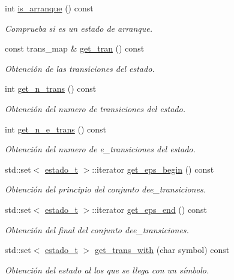 \begin{DoxyCompactItemize}
int \hyperlink{classestado__t_ac4d9e27de9fa01d3df4e4890f93d2d44}{is\+\_\+arranque} () const
\begin{DoxyCompactList}\small\item\em Comprueba si es un estado de arranque. \end{DoxyCompactList}\item 
const trans\+\_\+map \& \hyperlink{classestado__t_a95f73fed90d04dd47ba1243aa6f63cd3}{get\+\_\+tran} () const
\begin{DoxyCompactList}\small\item\em Obtención de las transiciones del estado. \end{DoxyCompactList}\item 
int \hyperlink{classestado__t_ac24561d5a9d347562fbb54c92dae297c}{get\+\_\+n\+\_\+trans} () const
\begin{DoxyCompactList}\small\item\em Obtención del numero de transiciones del estado. \end{DoxyCompactList}\item 
int \hyperlink{classestado__t_a9dd2c448db4e82bf749261309a84ae92}{get\+\_\+n\+\_\+e\+\_\+trans} () const
\begin{DoxyCompactList}\small\item\em Obtención del numero de e\+\_\+transiciones del estado. \end{DoxyCompactList}\item 
std\+::set$<$ \hyperlink{classestado__t}{estado\+\_\+t} $>$\+::iterator \hyperlink{classestado__t_a47b0d982bf6731d05537da75b001a35b}{get\+\_\+eps\+\_\+begin} () const
\begin{DoxyCompactList}\small\item\em Obtención del principio del conjunto dee\+\_\+transiciones. \end{DoxyCompactList}\item 
std\+::set$<$ \hyperlink{classestado__t}{estado\+\_\+t} $>$\+::iterator \hyperlink{classestado__t_a0c091366f5d27d58036d5b0b901570ae}{get\+\_\+eps\+\_\+end} () const
\begin{DoxyCompactList}\small\item\em Obtención del final del conjunto dee\+\_\+transiciones. \end{DoxyCompactList}\item 
std\+::set$<$ \hyperlink{classestado__t}{estado\+\_\+t} $>$ \hyperlink{classestado__t_af72252b5733a1b673b44f699a46f7491}{get\+\_\+trans\+\_\+with} (char symbol) const
\begin{DoxyCompactList}\small\item\em Obtención del estado al los que se llega con un símbolo. \end{DoxyCompactList}\item 

\end{DoxyCompactItemize}
